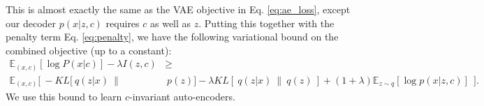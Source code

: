 This is almost exactly the same as the VAE objective in Eq. \ref{eq:ae_loss}, except our decoder $p(x|z,c)$ requires $c$ as well as $z$. Putting this together with the penalty term Eq. \ref{eq:penalty}, we have the following variational bound on the combined objective (up to a constant):
\begin{align}
\mathbb{E}_{(x,c)}[\log P(x|c)] - \lambda I(z,c) & \geq \nonumber \\
 \mathbb{E}_{(x,c)}[ ~ -KL[~  q(z|x)~\|&~p(z)]  - \lambda KL[~q(z|x)~\|~q(z)~] +
(1+\lambda)\mathbb{E}_{z\sim q}[\log p(x|z,c)] ~~ ]. \label{eq:unsup_objective}
\end{align}
We use this bound to learn $c$-invariant auto-encoders.

